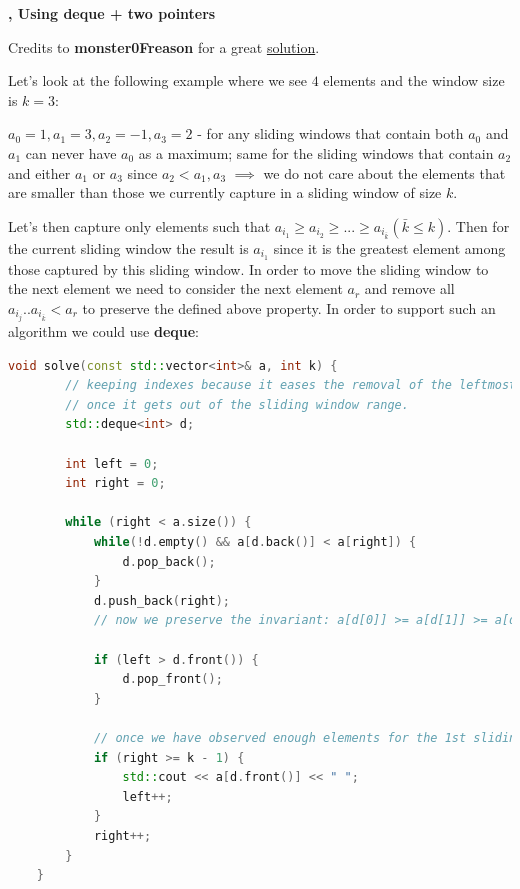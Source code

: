 \begin{solution}
    \textbf{, Using deque + two pointers}

    Credits to \textbf{monster0Freason} for a great \href{https://leetcode.com/problems/sliding-window-maximum/solutions/4628595/19-1-approach-1-o-n-python-c-step-by-step-explanation/}{solution}.

    Let's look at the following example where we see $4$ elements and the window size is $k=3$:

    $a_0=1, a_1=3, a_2=-1, a_3=2$ - for any sliding windows that contain both $a_0$ and $a_1$ can never have $a_0$ as a maximum; same for the sliding windows that contain $a_2$ and either $a_1$ or $a_3$ since $a_2 < a_1, a_3$ $\implies$ we do not care about the elements that are smaller than those we currently capture in a sliding window of size $k$.

    Let's then capture only elements such that $a_{i_1} \geq a_{i_2} \geq ... \geq a_{i_{\bar{k}}} (\bar{k} \leq k)$. Then for the current sliding window the result is $a_{i_1}$ since it is the greatest element among those captured by this sliding window. In order to move the sliding window to the next element we need to consider the next element $a_r$ and remove all $a_{i_j}..a_{i_{\bar{k}}} < a_r$ to preserve the defined above property. In order to support such an algorithm we could use \textbf{deque}:


    \begin{lstlisting}[language=C++]
    void solve(const std::vector<int>& a, int k) {
        // keeping indexes because it eases the removal of the leftmost element
        // once it gets out of the sliding window range.
        std::deque<int> d;

        int left = 0;
        int right = 0;

        while (right < a.size()) {
            while(!d.empty() && a[d.back()] < a[right]) {
                d.pop_back();
            }
            d.push_back(right);
            // now we preserve the invariant: a[d[0]] >= a[d[1]] >= a[d[2]] ...

            if (left > d.front()) {
                d.pop_front();
            }

            // once we have observed enough elements for the 1st sliding window
            if (right >= k - 1) {
                std::cout << a[d.front()] << " ";
                left++;
            }
            right++;
        }
    }
    \end{lstlisting}



\end{solution}
